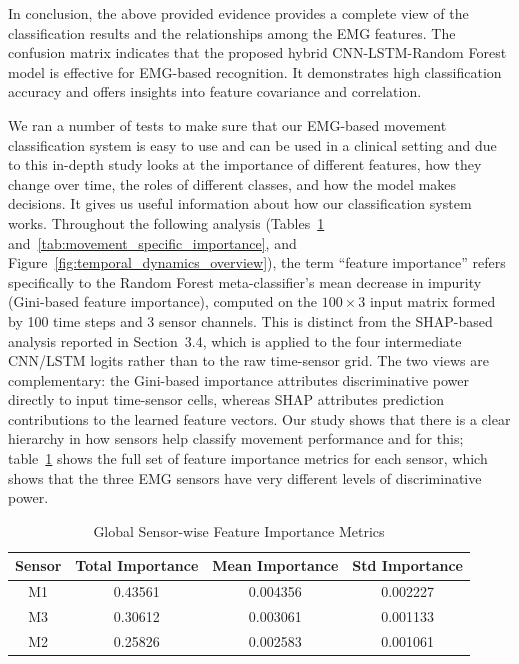 \documentclass{elektr}
\newcommand{\yh}[1]{#1}
\begin{document}
In conclusion, the above provided evidence provides a complete view of the classification results and the relationships among the EMG features. The confusion matrix indicates that the proposed hybrid CNN-LSTM-Random Forest model is effective for EMG-based recognition. It demonstrates high classification accuracy and offers insights into feature covariance and correlation.

We ran a number of tests to make sure that our EMG-based movement classification system is easy to use and can be used in a clinical setting and due to this in-depth study looks at the importance of different features, how they change over time, the roles of different classes, and how the model makes decisions. It gives us useful information about how our classification system works.
\yh{Throughout the following analysis (Tables~\ref{tab:global_sensor_importance} and~\ref{tab:movement_specific_importance}, and Figure~\ref{fig:temporal_dynamics_overview}), the term ``feature importance'' refers specifically to the Random Forest meta-classifier's mean decrease in impurity (Gini-based feature importance), computed on the $100 \times 3$ input matrix formed by 100 time steps and 3 sensor channels. This is distinct from the SHAP-based analysis reported in Section~3.4, which is applied to the four intermediate CNN/LSTM logits rather than to the raw time-sensor grid. The two views are complementary: the Gini-based importance attributes discriminative power directly to input time-sensor cells, whereas SHAP attributes prediction contributions to the learned feature vectors.}
Our study shows that there is a clear hierarchy in how sensors help classify movement performance and for this; table~\ref{tab:global_sensor_importance} shows the full set of feature importance metrics for each sensor, which shows that the three EMG sensors have very different levels of discriminative power.
\begin{table}[h]
	\centering
	\caption{Global Sensor-wise Feature Importance Metrics}
	\label{tab:global_sensor_importance}
	\begin{tabular}{|c|c|c|c|}
		\hline
		\textbf{Sensor} & \textbf{Total Importance} & \textbf{Mean Importance} & \textbf{Std Importance} \\
		\hline
		M1 & 0.43561 & 0.004356 & 0.002227 \\
		M3 & 0.30612 & 0.003061 & 0.001133 \\
		M2 & 0.25826 & 0.002583 & 0.001061 \\
		\hline
	\end{tabular}
\end{table}
\end{document}
